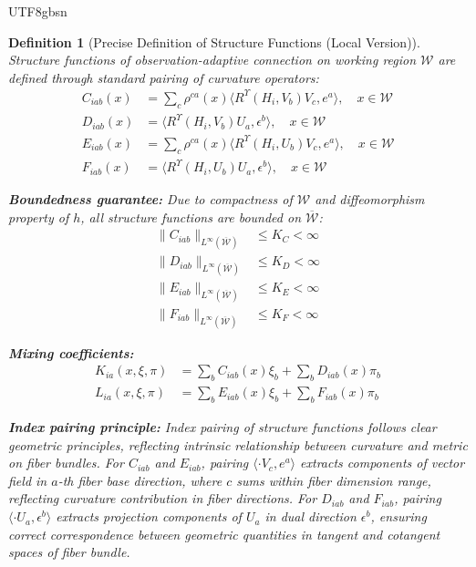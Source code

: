 \documentclass[a4paper,12pt]{extarticle}
\newtheorem{definition}{Definition}
\theoremstyle{definition}
\begin{document}
\begin{CJK}{UTF8}{gbsn}
\begin{definition}[Precise Definition of Structure Functions (Local Version)]
Structure functions of observation-adaptive connection on working region $\mathcal{W}$ are defined through standard pairing of curvature operators:
\begin{align*}
C_{iab}(x) &= \sum_c \rho^{ca}(x) \langle R^{\Upsilon}(H_i, V_b)V_c, e^a \rangle, \quad x \in \mathcal{W}\\
D_{iab}(x) &= \langle R^{\Upsilon}(H_i, V_b)U_a, \epsilon^b \rangle, \quad x \in \mathcal{W}\\
E_{iab}(x) &= \sum_c \rho^{ca}(x) \langle R^{\Upsilon}(H_i, U_b)V_c, e^a \rangle, \quad x \in \mathcal{W}\\
F_{iab}(x) &= \langle R^{\Upsilon}(H_i, U_b)U_a, \epsilon^b \rangle, \quad x \in \mathcal{W}
\end{align*}

\textbf{Boundedness guarantee:}
Due to compactness of $\mathcal{W}$ and diffeomorphism property of $h$, all structure functions are bounded on $\overline{\mathcal{W}}$:
\begin{align*}
\|C_{iab}\|_{L^\infty(\overline{\mathcal{W}})} &\leq K_C < \infty\\
\|D_{iab}\|_{L^\infty(\overline{\mathcal{W}})} &\leq K_D < \infty\\
\|E_{iab}\|_{L^\infty(\overline{\mathcal{W}})} &\leq K_E < \infty\\
\|F_{iab}\|_{L^\infty(\overline{\mathcal{W}})} &\leq K_F < \infty
\end{align*}

\textbf{Mixing coefficients:}
\begin{align*}
K_{ia}(x,\xi,\pi) &= \sum_b C_{iab}(x)\xi_b + \sum_b D_{iab}(x)\pi_b\\
L_{ia}(x,\xi,\pi) &= \sum_b E_{iab}(x)\xi_b + \sum_b F_{iab}(x)\pi_b
\end{align*}

\textbf{Index pairing principle:}
Index pairing of structure functions follows clear geometric principles, reflecting intrinsic relationship between curvature and metric on fiber bundles. For $C_{iab}$ and $E_{iab}$, pairing $\langle \cdot V_c, e^a \rangle$ extracts components of vector field in $a$-th fiber base direction, where $c$ sums within fiber dimension range, reflecting curvature contribution in fiber directions. For $D_{iab}$ and $F_{iab}$, pairing $\langle \cdot U_a, \epsilon^b \rangle$ extracts projection components of $U_a$ in dual direction $\epsilon^b$, ensuring correct correspondence between geometric quantities in tangent and cotangent spaces of fiber bundle.


\end{definition}
\end{CJK}
\end{document}

